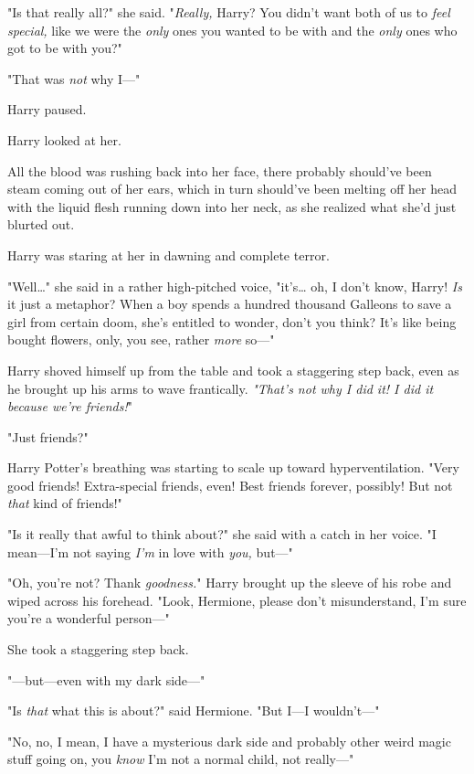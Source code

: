 "Is that really all?" she said. "\emph{Really,} Harry? You didn't want both of 
us to \emph{feel special,} like we were the \emph{only} ones you wanted to be 
with and the \emph{only} ones who got to be with you?"

"That was \emph{not} why I---"

Harry paused.

Harry looked at her.

All the blood was rushing back into her face, there probably should've been 
steam coming out of her ears, which in turn should've been melting off her head 
with the liquid flesh running down into her neck, as she realized what she'd 
just blurted out.

Harry was staring at her in dawning and complete terror.

"Well{\ldots}" she said in a rather high-pitched voice, "it's{\ldots} oh, I 
don't know, Harry! \emph{Is} it just a metaphor? When a boy spends a hundred 
thousand Galleons to save a girl from certain doom, she's entitled to wonder, 
don't you think? It's like being bought flowers, only, you see, rather 
\emph{more} so---"

Harry shoved himself up from the table and took a staggering step back, even as 
he brought up his arms to wave frantically. \emph{"That's not why I did it! I 
did it because we're friends!}"

"Just friends?"

Harry Potter's breathing was starting to scale up toward hyperventilation. 
"Very good friends! Extra-special friends, even! Best friends forever, 
possibly! But not \emph{that} kind of friends!"

"Is it really that awful to think about?" she said with a catch in her voice. 
"I mean---I'm not saying \emph{I'm} in love with \emph{you,} but---"

"Oh, you're not? Thank \emph{goodness.}" Harry brought up the sleeve of his 
robe and wiped across his forehead. "Look, Hermione, please don't 
misunderstand, I'm sure you're a wonderful person---"

She took a staggering step back.

"---but---even with my dark side---"

"Is \emph{that} what this is about?" said Hermione. "But I---I wouldn't---"

"No, no, I mean, I have a mysterious dark side and probably other weird magic 
stuff going on, you \emph{know} I'm not a normal child, not really---"

